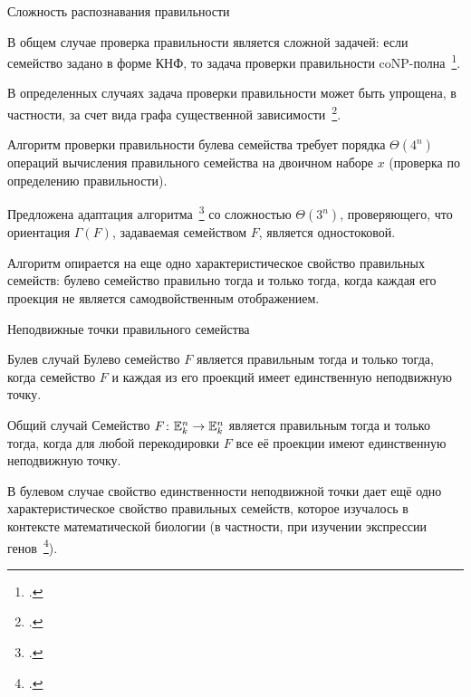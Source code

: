 \begin{frame}{Сложность распознавания правильности}
    \begin{coloritemize}
        \item В общем случае проверка правильности является сложной задачей: если семейство задано в форме КНФ, то задача проверки правильности coNP-полна~\footcite{nosov98}.
        \pause 
        \item В определенных случаях задача проверки правильности может быть упрощена, в частности, за счет вида графа существенной зависимости~\footcite{rykov14}.
        \pause 
        \item Алгоритм проверки правильности булева семейства требует порядка $\Theta(4^n)$ операций вычисления правильного семейства на двоичном наборе $x$ (проверка по определению правильности).
        \pause 
        \item Предложена адаптация алгоритма~\footcite{bosshard2017pseudo} со сложностью $\Theta(3^n)$, проверяющего, что ориентация $\Gamma(F)$, задаваемая семейством $F$, является одностоковой.
        \pause 
        \item Алгоритм опирается на еще одно характеристическое свойство правильных семейств: булево семейство правильно тогда и только тогда, когда каждая его проекция не является самодвойственным отображением.
    \end{coloritemize}
\end{frame}


\begin{frame}{Неподвижные точки правильного семейства}
    \begin{mytheorem}{Булев случай}
        Булево семейство $F$ является правильным тогда и только тогда, когда семейство $F$ и каждая из его проекций имеет единственную неподвижную точку.
    \end{mytheorem}
    \pause 
    \begin{mypropos}{Общий случай}
        Семейство $F \colon \mathbb{E}_k^n \to \mathbb{E}_k^n$ является правильным тогда и только тогда, когда для любой перекодировки $F$ все её проекции имеют единственную неподвижную точку.
    \end{mypropos}
    \pause 
    В булевом случае свойство единственности неподвижной точки дает ещё одно характеристическое свойство правильных семейств, которое изучалось в контексте математической биологии (в частности, при изучении экспрессии генов~\footcite{thomas1991regulatory, richard2015fixed, ruet2015asynchronous, ruet2016local}).    
\end{frame}


